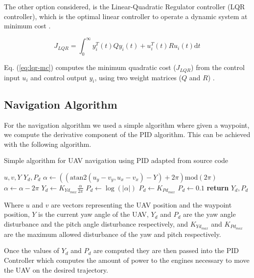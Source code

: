 The other option considered, is the Linear-Quadratic Regulator controller (LQR controller), which is the 
optimal linear controller to operate a dynamic system at minimum cost \autocite{NH20}.

\begin{equation}
	J_{LQR} = \int^\infty_0 y_i^T(t) Q y_i (t) + u_i^T (t) R u_i (t) \mathrm{d}t
	\label{eq:lqr-mc}
\end{equation}

Eq. (\ref{eq:lqr-mc}) computes the minimum quadratic cost ($J_{LQR}$) from the control input $u_i$ and control
output $y_i$, using two weight matrices ($Q$ and $R$) \autocite{NH20}.

\subsection{Navigation Algorithm}

For the navigation algorithm we used a simple algorithm where given a waypoint, we compute the 
derivative component of the PID algorithm. This can be achieved with the following algorithm.

\begin{algorithm}
	\algrenewcommand{}
	\algrenewcommand{}
	\caption{Simple algorithm for UAV navigation using PID adapted from \autocite{CB23} source code}\label{alg:nav}
	\begin{algorithmic}[1]
		\Require $u, v, Y$
		\Ensure $Y_d, P_d$
		\State $\alpha \gets ((\mathrm{atan2}(u_y - v_y, u_x - v_x) - Y) + 2 \pi) \mathrm{mod} (2 \pi)$
		\If{$\alpha > \pi$ }
		\State $\alpha \gets \alpha - 2 \pi$
		\EndIf
		\State $Y_d \gets K_{Yd_{max}} \frac{\alpha}{2\pi}$
		\State $P_d \gets \log(|\alpha|)$
		\State $P_d \gets K_{Pd_{max}}$
		\State $P_d \gets 0.1$
		\EndIf
		\State \textbf{return} $Y_d, P_d$
	\end{algorithmic}
\end{algorithm}

Where $u$ and $v$ are vectors representing the UAV position and the waypoint position, $Y$ is the current 
yaw angle of the UAV, $Y_d$ and $P_d$ are the yaw angle disturbance and the pitch angle disturbance
respectively, and $K_{Yd_{max}}$ and $K_{Pd_{max}}$ are the maximum allowed disturbance of the yaw and 
pitch respectively.

Once the values of $Y_d$ and $P_d$ are computed they are then passed into the PID Controller which computes
the amount of power to the engines necessary to move the UAV on the desired trajectory.

